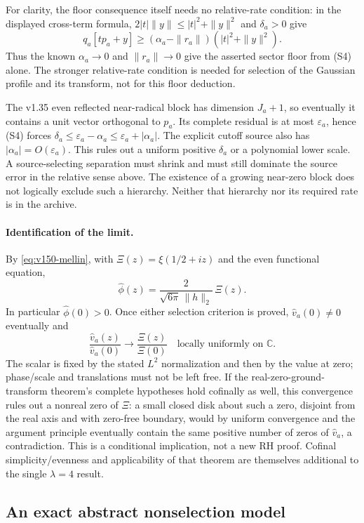 \documentclass[11pt]{article}
\theoremstyle{remark}
\begin{document}
For clarity, the floor consequence itself needs no relative-rate
condition: in the displayed cross-term formula,
$2|t|\|y\|\le |t|^2+\|y\|^2$ and $\delta_a>0$ give
\[
 q_a[tp_a+y]\ge(\alpha_a-\|r_a\|)(|t|^2+\|y\|^2).
\]
Thus the known $\alpha_a\to0$ and $\|r_a\|\to0$ give the asserted
sector floor from (S4) alone. The stronger relative-rate condition
is needed for selection of the Gaussian profile and its transform,
not for this floor deduction.

The v1.35 even reflected near-radical block has dimension $J_a+1$,
so eventually it contains a unit vector orthogonal to $p_a$. Its complete
residual is at most $\varepsilon_a$, hence (S4) forces
$\delta_a\le\varepsilon_a-\alpha_a\le\varepsilon_a+|\alpha_a|$.
The explicit cutoff source also has $|\alpha_a|=O(\varepsilon_a)$.
This rules out a uniform positive $\delta_a$ or a polynomial lower scale.
A source-selecting separation must shrink and must still dominate the
source error in the relative sense above. The existence of a growing
near-zero block does not logically exclude such a hierarchy. Neither
that hierarchy nor its required rate is in the archive.

\paragraph{Identification of the limit.}
By \eqref{eq:v150-mellin}, with
$\Xi(z)=\xi(1/2+iz)$ and the even functional equation,
\[
 \widehat\phi(z)=\frac{2}{\sqrt{6\pi}\,\|h\|_2}\,\Xi(z).
\]
In particular $\widehat\phi(0)>0$. Once either selection criterion is
proved, $\widehat v_a(0)\ne0$ eventually and
\[
 \frac{\widehat v_a(z)}{\widehat v_a(0)}
 \longrightarrow\frac{\Xi(z)}{\Xi(0)}
 \quad\text{locally uniformly on }\mathbb C.
\]
The scalar is fixed by the stated $L^2$ normalization and then by the
value at zero; phase/scale and translations must not be left free.
If the real-zero-ground-transform theorem's complete hypotheses hold
cofinally as well, this convergence rules out a nonreal zero of $\Xi$:
a small closed disk about such a zero, disjoint from the real axis and
with zero-free boundary, would by uniform convergence and the argument
principle eventually contain the same positive number of zeros of
$\widehat v_a$, a contradiction. This is a conditional implication,
not a new RH proof. Cofinal simplicity/evenness and applicability of
that theorem are themselves additional to the single $\lambda=4$ result.

\subsection*{An exact abstract nonselection model}
\end{document}
